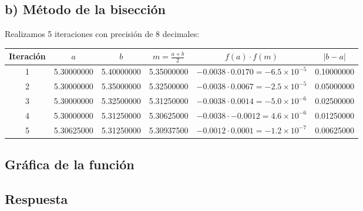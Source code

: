 \documentclass[12pt]{article}
\begin{document}
\begin{center}
\subsection*{b) Método de la bisección}

Realizamos 5 iteraciones con precisión de 8 decimales:

\begin{center}
\begin{tabular}{@{}cccccc@{}}
\toprule
Iteración & \(a\)         & \(b\)         & \(m=\tfrac{a+b}{2}\) & \(f(a)\cdot f(m)\)      & \(\lvert b-a\rvert\)   \\
\midrule
1         & 5.30000000    & 5.40000000    & 5.35000000           & \(-0.0038\cdot0.0170=-6.5\times10^{-5}\) & 0.10000000 \\
2         & 5.30000000    & 5.35000000    & 5.32500000           & \(-0.0038\cdot0.0067=-2.5\times10^{-5}\) & 0.05000000 \\
3         & 5.30000000    & 5.32500000    & 5.31250000           & \(-0.0038\cdot0.0014=-5.0\times10^{-6}\) & 0.02500000 \\
4         & 5.30000000    & 5.31250000    & 5.30625000           & \(-0.0038\cdot-0.0012=4.6\times10^{-6}\) & 0.01250000 \\
5         & 5.30625000    & 5.31250000    & 5.30937500           & \(-0.0012\cdot0.0001=-1.2\times10^{-7}\) & 0.00625000 \\
\bottomrule
\end{tabular}
\end{center}

\subsection*{Gráfica de la función}

\begin{center}
\end{center}

\subsection*{Respuesta}


\end{center}
\end{document}
